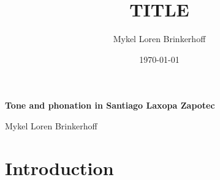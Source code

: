 \documentclass[12pt, letterpaper]{article}
\title{TITLE}
\author{Mykel Loren Brinkerhoff}
\date{\today}
\begin{document}
	
	
	
\begin{center}
	{\Large \textbf{Tone and phonation in Santiago Laxopa Zapotec}}
	\vspace{6pt}

	Mykel Loren Brinkerhoff
\end{center}
\thispagestyle{fancy}

\tableofcontents

\section{Introduction} \label{sec:Introduction}
\end{document}
